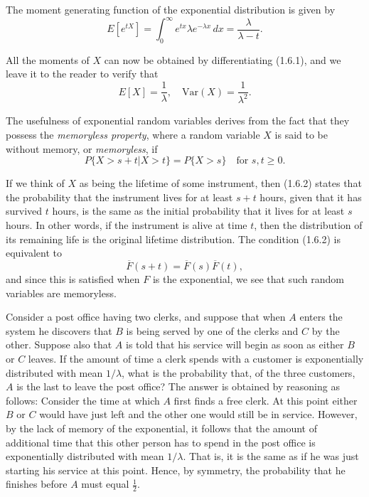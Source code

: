 \documentclass[lang=cn,10pt]{elegantbook}
\begin{document}
The moment generating function of the exponential distribution is given by
\begin{equation}
E[e^{tX}] = \int_{0}^{\infty} e^{tx} \lambda e^{-\lambda x} \, dx = \frac{\lambda}{\lambda - t}. \tag{1.6.1}
\end{equation}

All the moments of $X$ can now be obtained by differentiating (1.6.1), and we leave it to the reader to verify that
\[
E[X] = \frac{1}{\lambda}, \quad \text{Var}(X) = \frac{1}{\lambda^2}.
\]

The usefulness of exponential random variables derives from the fact that they possess the \textit{memoryless property}, where a random variable $X$ is said to be without memory, or \textit{memoryless}, if
\begin{equation}
P\{X > s + t | X > t\} = P\{X > s\} \quad \text{for } s, t \geq 0. \tag{1.6.2}
\end{equation}

If we think of $X$ as being the lifetime of some instrument, then (1.6.2) states that the probability that the instrument lives for at least $s + t$ hours, given that it has survived $t$ hours, is the same as the initial probability that it lives for at least $s$ hours. In other words, if the instrument is alive at time $t$, then the distribution of its remaining life is the original lifetime distribution. The condition (1.6.2) is equivalent to
\[
\overline{F}(s + t) = \overline{F}(s) \overline{F}(t),
\]
and since this is satisfied when $F$ is the exponential, we see that such random variables are memoryless.
\begin{example}
	Consider a post office having two clerks, and suppose that when $A$ enters the system he discovers that $B$ is being served by one of the clerks and $C$ by the other. Suppose also that $A$ is told that his service will begin as soon as either $B$ or $C$ leaves. If the amount of time a clerk spends with a customer is exponentially distributed with mean $1/\lambda$, what is the probability that, of the three customers, $A$ is the last to leave the post office?
The answer is obtained by reasoning as follows: Consider the time at which $A$ first finds a free clerk. At this point either $B$ or $C$ would have just left and the other one would still be in service. However, by the lack of memory of the exponential, it follows that the amount of additional time that this other person has to spend in the post office is exponentially distributed with mean $1/\lambda$. That is, it is the same as if he was just starting his service at this point. Hence, by symmetry, the probability that he finishes before $A$ must equal $\frac{1}{2}$.
\end{example}
\end{document}
